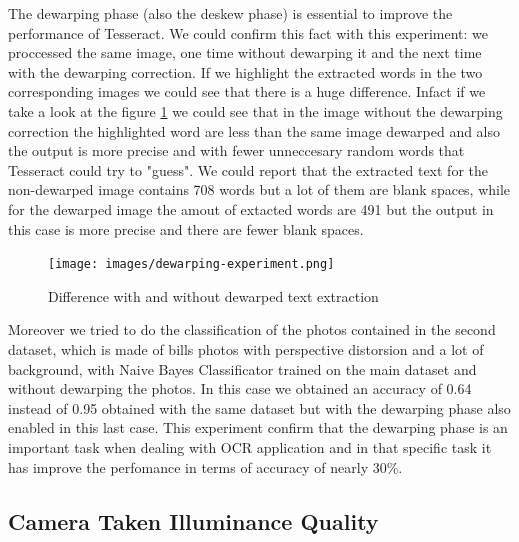 \documentclass[10pt,twocolumn,letterpaper]{article}
\begin{document}
The dewarping phase (also the deskew phase) is essential to improve the
performance of Tesseract. We could confirm this fact with this
experiment: we proccessed the same image, one time without dewarping
it and the next time with the dewarping correction. If we highlight
the extracted words in the two corresponding images we could see that
there is a huge difference. Infact if we take a look at the figure
\ref{dewarping-experiment} we could see that in the image without the
dewarping correction the highlighted word are less than the same image
dewarped and also the output is more precise and with fewer
unneccesary random words that Tesseract could try to "guess". We could
report that the extracted text for the non-dewarped image contains 708
words but a lot of them are blank spaces, while for the dewarped image
the amout of extacted words are 491 but the output in this case is
more precise and there are fewer blank spaces.

\begin{figure}[b]
  \centering
  \texttt{[image: images/dewarping-experiment.png]}
  \caption{Difference with and without dewarped text extraction}
  \label{dewarping-experiment}
\end{figure}

Moreover we tried to do the classification of the photos contained in
the second dataset, which is made of bills photos with perspective
distorsion and a lot of background, with Naive Bayes Classificator
trained on the main dataset and without dewarping the photos. In this
case we obtained an accuracy of 0.64 instead of 0.95 obtained with the
same dataset but with the dewarping phase also enabled in this last
case. This experiment confirm that the dewarping phase is an important
task when dealing with OCR application and in that specific task it
has improve the perfomance in terms of accuracy of nearly 30\%.

\subsection{Camera Taken Illuminance Quality}
\end{document}
